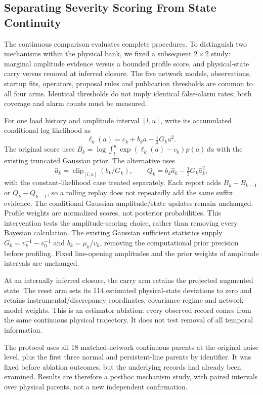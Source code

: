\subsection{Separating Severity Scoring From State Continuity}
\label{sec:component-study}

The continuous comparison evaluates complete procedures. To distinguish
two mechanisms within the physical bank, we fixed a subsequent $2\times2$
study: marginal amplitude evidence versus a bounded profile score, and
physical-state carry versus removal at inferred closure. The five network
models, observations, startup fits, operators, proposal rules and
publication thresholds are common to all four arms. Identical thresholds
do not imply identical false-alarm rates; both coverage and alarm counts
must be measured.

For one load history and amplitude interval $[l,u]$, write its accumulated
conditional log likelihood as
\begin{equation}
 \ell_k(a)=c_k+b_k a-\tfrac12 G_k a^2.
 \label{eq:ablation-quadratic}
\end{equation}
The original score uses $B_k=\log\int_l^u
\exp(\ell_k(a)-c_k)p(a)\,da$ with the existing truncated Gaussian prior.
The alternative uses
\begin{equation}
 \widehat a_k=\operatorname{clip}_{[l,u]}(b_k/G_k),\qquad
 Q_k=b_k\widehat a_k-\tfrac12G_k\widehat a_k^2,
 \label{eq:ablation-profile}
\end{equation}
with the constant-likelihood case treated separately. Each report adds
$B_k-B_{k-1}$ or $Q_k-Q_{k-1}$, so a rolling replay does not repeatedly
add the same suffix evidence. The conditional Gaussian amplitude/state
updates remain unchanged. Profile weights are normalized scores, not
posterior probabilities. This intervention tests the amplitude-scoring
choice, rather than removing every Bayesian calculation.
The existing Gaussian sufficient statistics supply
$G_k=v_k^{-1}-v_0^{-1}$ and $b_k=\mu_k/v_k$, removing the computational
prior precision before profiling. Fixed line-opening amplitudes and the
prior weights of amplitude intervals are unchanged.

At an internally inferred closure, the carry arm retains the projected
augmented state. The reset arm sets its 114 estimated physical-state
deviations to zero and retains instrumental/discrepancy coordinates,
covariance regime and network-model weights. This is an estimator
ablation: every observed record comes from the same continuous physical
trajectory. It does not test removal of all temporal information.

The protocol uses all 18 matched-network continuous parents at the
original noise level, plus the first three normal and persistent-line
parents by identifier. It was fixed before ablation outcomes, but the
underlying records had already been examined. Results are therefore a
posthoc mechanism study, with paired intervals over physical parents,
not a new independent confirmation.
